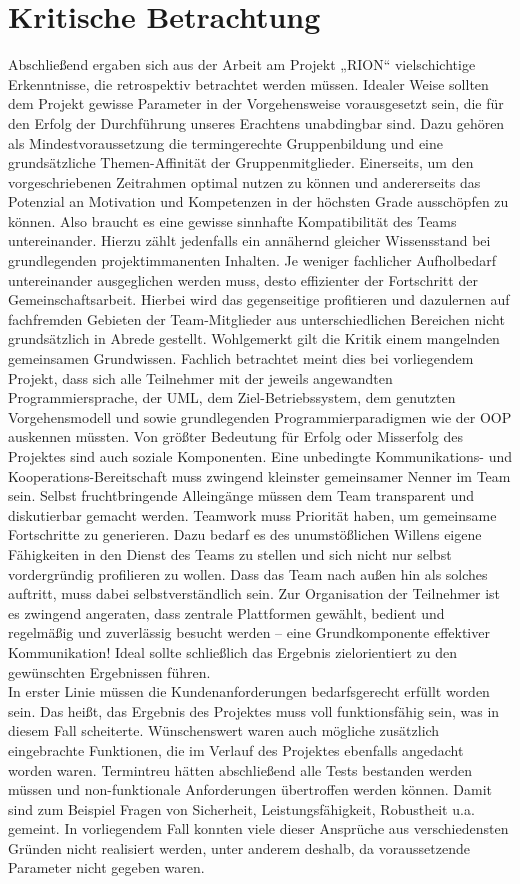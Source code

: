 \chapter{Kritische Betrachtung}

Abschließend ergaben sich aus der Arbeit am Projekt „RION“ vielschichtige Erkenntnisse, die retrospektiv betrachtet werden müssen.
Idealer Weise sollten dem Projekt gewisse Parameter in der Vorgehensweise vorausgesetzt sein, die für den Erfolg der Durchführung unseres Erachtens unabdingbar sind. Dazu gehören als Mindestvoraussetzung die termingerechte Gruppenbildung und eine grundsätzliche Themen-Affinität der Gruppenmitglieder. Einerseits, um den vorgeschriebenen Zeitrahmen optimal nutzen zu können und andererseits das Potenzial an Motivation und Kompetenzen in der höchsten Grade ausschöpfen zu können. Also braucht es eine gewisse sinnhafte Kompatibilität des Teams untereinander. Hierzu zählt jedenfalls ein annähernd gleicher Wissensstand bei grundlegenden projektimmanenten Inhalten. Je weniger fachlicher Aufholbedarf untereinander ausgeglichen werden muss, desto effizienter der Fortschritt der Gemeinschaftsarbeit. Hierbei wird das gegenseitige profitieren und dazulernen auf fachfremden Gebieten der Team-Mitglieder aus unterschiedlichen Bereichen nicht grundsätzlich in Abrede gestellt. Wohlgemerkt gilt die Kritik einem mangelnden gemeinsamen Grundwissen. Fachlich betrachtet meint dies bei vorliegendem Projekt, dass sich alle Teilnehmer mit der jeweils angewandten Programmiersprache, der UML, dem Ziel-Betriebssystem, dem genutzten Vorgehensmodell und sowie grundlegenden Programmierparadigmen wie der OOP auskennen müssten.
Von größter Bedeutung für Erfolg oder Misserfolg des Projektes sind auch soziale Komponenten. Eine unbedingte Kommunikations- und Kooperations-Bereitschaft muss zwingend kleinster gemeinsamer Nenner im Team sein. Selbst fruchtbringende Alleingänge müssen dem Team transparent und diskutierbar gemacht werden. Teamwork muss Priorität haben, um gemeinsame Fortschritte zu generieren. Dazu bedarf es des unumstößlichen Willens eigene Fähigkeiten in den Dienst des Teams zu stellen und sich nicht nur selbst vordergründig profilieren zu wollen. Dass das Team nach außen hin als solches auftritt, muss dabei selbstverständlich sein.
Zur Organisation der Teilnehmer ist es zwingend angeraten, dass zentrale Plattformen gewählt, bedient und regelmäßig und zuverlässig besucht werden – eine Grundkomponente effektiver Kommunikation!
Ideal sollte schließlich das Ergebnis zielorientiert zu den gewünschten Ergebnissen führen.\\
In erster Linie müssen die Kundenanforderungen bedarfsgerecht erfüllt worden sein. Das heißt, das Ergebnis des Projektes muss voll funktionsfähig sein, was in diesem Fall scheiterte. Wünschenswert waren auch mögliche zusätzlich eingebrachte Funktionen, die im Verlauf des Projektes ebenfalls angedacht worden waren.
Termintreu hätten abschließend alle Tests bestanden werden müssen und non-funktionale Anforderungen übertroffen werden können. Damit sind zum Beispiel Fragen von Sicherheit, Leistungsfähigkeit, Robustheit u.a. gemeint.
In vorliegendem Fall konnten viele dieser Ansprüche aus verschiedensten Gründen nicht realisiert werden, unter anderem deshalb, da voraussetzende Parameter nicht gegeben waren.

